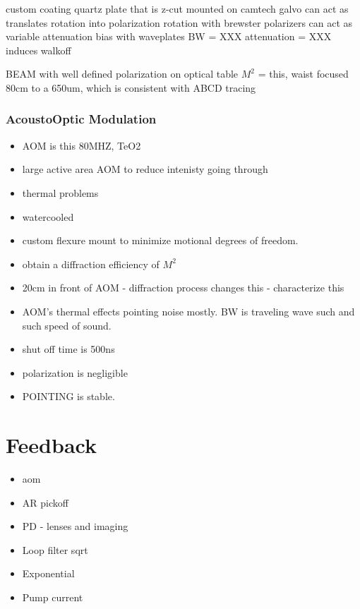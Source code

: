 \documentclass[twocolumn,aps,pra,showpacs,preprintnumbers,bibnotes]{revtex4-1}
\begin{document}
custom coating quartz plate that is z-cut mounted on camtech galvo
can act as translates rotation into polarization rotation
with brewster polarizers can act as variable attenuation
bias with waveplates
BW = XXX
attenuation = XXX
induces walkoff

BEAM with well defined polarization on optical table 
$M^2$ = this, waist focused 80cm to a 650um, which is consistent with ABCD tracing

\subsubsection{AcoustoOptic Modulation}

\begin{itemize}
    \item AOM is this 80MHZ, TeO2
    \item large active area AOM to reduce intenisty going through
    \item thermal problems
    \item watercooled
    \item custom flexure mount to minimize motional degrees of freedom.
    \item obtain a diffraction efficiency of $M^2$
    \item 20cm in front of AOM - diffraction process changes this - characterize this
    \item AOM's thermal effects pointing noise mostly. BW is traveling wave such and such speed of sound.
    \item shut off time is 500ns
    \item polarization is negligible
    \item POINTING is stable.
\end{itemize}

\section{Feedback}
\begin{itemize}
    \item aom
    \item AR pickoff
    \item PD - lenses and imaging
    \item Loop filter sqrt
    \item Exponential
    \item Pump current
\end{itemize}
\end{document}
